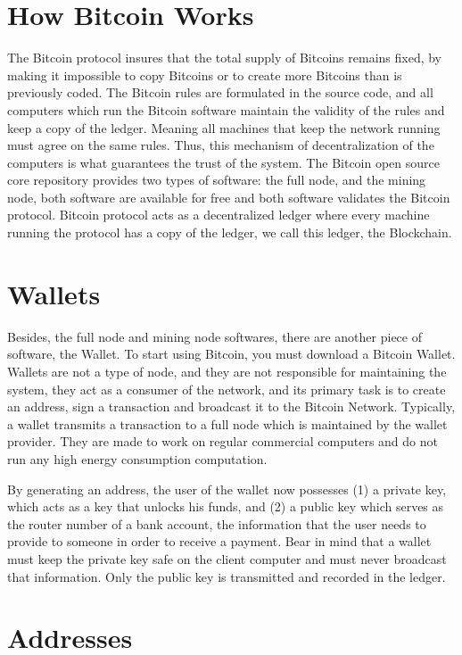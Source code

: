 \documentclass[../../thesis.tex]{subfiles}
\begin{document}
\section{How Bitcoin Works}
\label{sec:bitcoin_works}

 The Bitcoin protocol insures that the total supply of Bitcoins remains fixed, by making it impossible to copy Bitcoins or to create more Bitcoins than is previously coded. The Bitcoin rules are formulated in the source code, and all computers which run the Bitcoin software maintain the validity of the rules and keep a copy of the ledger. Meaning all machines that keep the network running must agree on the same rules. Thus, this mechanism of decentralization of the computers is what guarantees the trust of the system. The Bitcoin open source core repository provides two types of software: the full node, and the mining node, both software are available for free and both software validates the Bitcoin protocol. Bitcoin protocol acts as a decentralized ledger where every machine running the protocol has a copy of the ledger, we call this ledger, the Blockchain.

\section{Wallets}
\label{sec:bitcoin_wallet}
Besides, the full node and mining node softwares, there are another piece of software, the Wallet. To start using Bitcoin, you must download a Bitcoin Wallet. Wallets are not a type of node, and they are not responsible for maintaining the system, they act as a consumer of the network, and its primary task is to create an address, sign a transaction and broadcast it to the Bitcoin Network. Typically, a wallet transmits a transaction to a full node which is maintained by the wallet provider. They are made to work on regular commercial computers and do not run any high energy consumption computation.

By generating an address, the user of the wallet now possesses (1) a private key, which acts as a key that unlocks his funds, and (2) a public key which serves as the router number of a bank account, the information that the user needs to provide to someone in order to receive a payment. Bear in mind that a wallet must keep the private key safe on the client computer and must never broadcast that information. Only the public key is transmitted and recorded in the ledger. 


\section{Addresses}
\label{sec:bitcoin_address}
\end{document}
